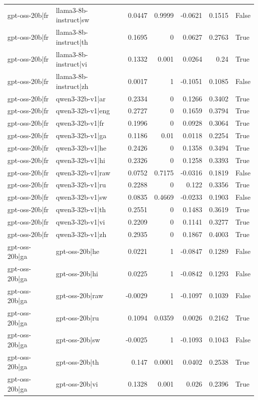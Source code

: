 \begin{table}
\begin{tabular}{l l r r r r l}
gpt-oss-20b|fr & llama3-8b-instruct|sw & 0.0447 & 0.9999 & -0.0621 & 0.1515 & False \\
gpt-oss-20b|fr & llama3-8b-instruct|th & 0.1695 & 0 & 0.0627 & 0.2763 & True \\
gpt-oss-20b|fr & llama3-8b-instruct|vi & 0.1332 & 0.001 & 0.0264 & 0.24 & True \\
gpt-oss-20b|fr & llama3-8b-instruct|zh & 0.0017 & 1 & -0.1051 & 0.1085 & False \\
gpt-oss-20b|fr & qwen3-32b-v1|ar & 0.2334 & 0 & 0.1266 & 0.3402 & True \\
gpt-oss-20b|fr & qwen3-32b-v1|eng & 0.2727 & 0 & 0.1659 & 0.3794 & True \\
gpt-oss-20b|fr & qwen3-32b-v1|fr & 0.1996 & 0 & 0.0928 & 0.3064 & True \\
gpt-oss-20b|fr & qwen3-32b-v1|ga & 0.1186 & 0.01 & 0.0118 & 0.2254 & True \\
gpt-oss-20b|fr & qwen3-32b-v1|he & 0.2426 & 0 & 0.1358 & 0.3494 & True \\
gpt-oss-20b|fr & qwen3-32b-v1|hi & 0.2326 & 0 & 0.1258 & 0.3393 & True \\
gpt-oss-20b|fr & qwen3-32b-v1|raw & 0.0752 & 0.7175 & -0.0316 & 0.1819 & False \\
gpt-oss-20b|fr & qwen3-32b-v1|ru & 0.2288 & 0 & 0.122 & 0.3356 & True \\
gpt-oss-20b|fr & qwen3-32b-v1|sw & 0.0835 & 0.4669 & -0.0233 & 0.1903 & False \\
gpt-oss-20b|fr & qwen3-32b-v1|th & 0.2551 & 0 & 0.1483 & 0.3619 & True \\
gpt-oss-20b|fr & qwen3-32b-v1|vi & 0.2209 & 0 & 0.1141 & 0.3277 & True \\
gpt-oss-20b|fr & qwen3-32b-v1|zh & 0.2935 & 0 & 0.1867 & 0.4003 & True \\
gpt-oss-20b|ga & gpt-oss-20b|he & 0.0221 & 1 & -0.0847 & 0.1289 & False \\
gpt-oss-20b|ga & gpt-oss-20b|hi & 0.0225 & 1 & -0.0842 & 0.1293 & False \\
gpt-oss-20b|ga & gpt-oss-20b|raw & -0.0029 & 1 & -0.1097 & 0.1039 & False \\
gpt-oss-20b|ga & gpt-oss-20b|ru & 0.1094 & 0.0359 & 0.0026 & 0.2162 & True \\
gpt-oss-20b|ga & gpt-oss-20b|sw & -0.0025 & 1 & -0.1093 & 0.1043 & False \\
gpt-oss-20b|ga & gpt-oss-20b|th & 0.147 & 0.0001 & 0.0402 & 0.2538 & True \\
gpt-oss-20b|ga & gpt-oss-20b|vi & 0.1328 & 0.001 & 0.026 & 0.2396 & True \\

\end{tabular}
\end{table}

